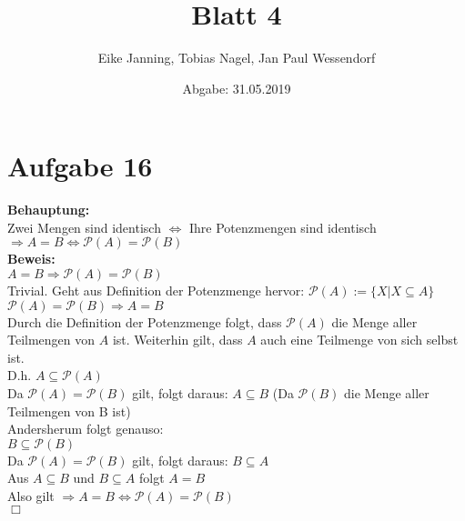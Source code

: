\documentclass[paper = a4, ngerman]{scrartcl}
\title{Blatt 4}
\author{Eike Janning, Tobias Nagel, Jan Paul Wessendorf}
\date{Abgabe: 31.05.2019}
\begin{document}
	\maketitle
	\hrulefill
	
	\section*{Aufgabe 16}
	
	\textbf{Behauptung:}\\
	Zwei Mengen sind identisch $\Leftrightarrow$ Ihre Potenzmengen sind identisch\\
	
	$\Rightarrow A = B \Leftrightarrow \mathcal{P}(A) = \mathcal{P}(B) $\\
	
	\textbf{Beweis:}\\
	$ A = B \Rightarrow \mathcal{P}(A) = \mathcal{P}(B) $\\
	Trivial. Geht aus Definition der Potenzmenge hervor: $\mathcal{P}(A) := \{ X | X \subseteq A\}$\\
	
	$\mathcal{P}(A) = \mathcal{P}(B) \Rightarrow A = B$\\
	
	Durch die Definition der Potenzmenge folgt, dass $\mathcal{P}(A)$ die Menge aller Teilmengen von $A$ ist. Weiterhin gilt, dass $A$ auch eine Teilmenge von sich selbst ist.\\
	D.h. $A \subseteq \mathcal{P}(A)$\\
	Da $\mathcal{P}(A) = \mathcal{P}(B)$ gilt, folgt daraus: $A \subseteq B$  (Da $\mathcal{P}(B)$ die Menge aller Teilmengen von B ist)\\
	
	Andersherum folgt genauso:\\
	$B \subseteq \mathcal{P}(B)$\\
	Da $\mathcal{P}(A) = \mathcal{P}(B)$ gilt, folgt daraus: $B \subseteq A$\\
	
	Aus $A \subseteq B$ und $B \subseteq A$ folgt $A = B$\\
	
	Also gilt 	$\Rightarrow A = B \Leftrightarrow \mathcal{P}(A) = \mathcal{P}(B) $\\
	
	\hfil$\Box$
\end{document}
